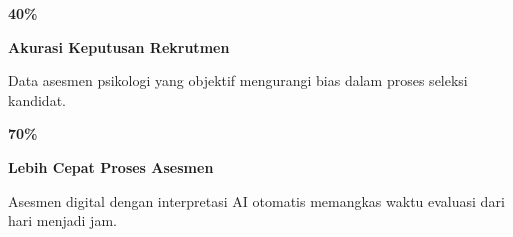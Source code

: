 \documentclass[a4paper]{article}
\begin{document}
\noindent
\begin{minipage}[t]{0.485\textwidth}
    \noindent\colorbox{BlueBg}{%
        \begin{minipage}[t][2.7cm][c]{\dimexpr\linewidth-2\fboxsep\relax}
            \centering
            {\fontsize{20}{24}\selectfont\bfseries\color{FuchsiaPrimary} 40\%}\par\vspace{2pt}
            {\fontsize{9.5}{12}\selectfont\bfseries\color{BlueDark} Akurasi Keputusan Rekrutmen}\par\vspace{2pt}
            {\fontsize{8.5}{11}\selectfont\color{TextDark}Data asesmen psikologi yang objektif mengurangi bias dalam proses seleksi kandidat.}
        \end{minipage}}\par
    \vspace{6pt}
    \noindent\colorbox{BlueBg}{%
        \begin{minipage}[t][2.7cm][c]{\dimexpr\linewidth-2\fboxsep\relax}
            \centering
            {\fontsize{20}{24}\selectfont\bfseries\color{FuchsiaPrimary} 70\%}\par\vspace{2pt}
            {\fontsize{9.5}{12}\selectfont\bfseries\color{BlueDark} Lebih Cepat Proses Asesmen}\par\vspace{2pt}
            {\fontsize{8.5}{11}\selectfont\color{TextDark}Asesmen digital dengan interpretasi AI otomatis memangkas waktu evaluasi dari hari menjadi jam.}
        \end{minipage}}%
\end{minipage}%
\hfill
\end{document}
